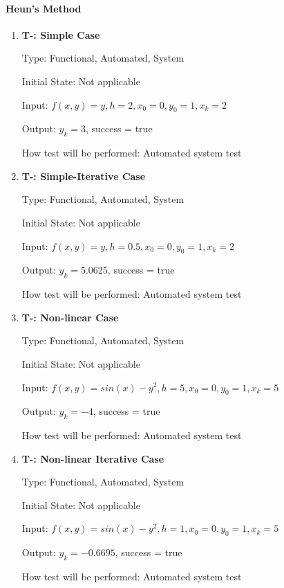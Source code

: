 \documentclass[12pt, titlepage]{article}
\newcounter{tnum} %
\begin{document}
\paragraph{Heun's Method}
\begin{enumerate}

\item{\textbf{T-\thetnum \label{t-heun_simple}: Simple Case}}

Type: Functional, Automated, System %
					
Initial State: Not applicable
					
Input: $f(x, y) = y, h = 2, x_0 = 0, y_0 = 1, x_k = 2$
					
Output: $y_k = 3$, success = true
					
How test will be performed: Automated system test

\item{\textbf{T-\thetnum \label{t-heun_simpleiterative}: Simple-Iterative Case}}

Type: Functional, Automated, System %
					
Initial State: Not applicable
					
Input: $f(x, y) = y, h = 0.5, x_0 = 0, y_0 = 1, x_k = 2$
					
Output: $y_k = 5.0625$, success = true
					
How test will be performed: Automated system test

\item{\textbf{T-\thetnum \label{t-heun_nonlinear}: Non-linear Case}}

Type: Functional, Automated, System %
					
Initial State: Not applicable
					
Input: $f(x, y) = sin(x) - y^2, h = 5, x_0 = 0, y_0 = 1, x_k = 5$
					
Output: $y_k = -4$, success = true
					
How test will be performed: Automated system test

\item{\textbf{T-\thetnum \label{t-heun_nonlineariterative}: Non-linear Iterative Case}}

Type: Functional, Automated, System %
					
Initial State: Not applicable
					
Input: $f(x, y) = sin(x) - y^2, h = 1, x_0 = 0, y_0 = 1, x_k = 5$
					
Output: $y_k = -0.6695$, success = true
					
How test will be performed: Automated system test

\end{enumerate}
\end{document}
